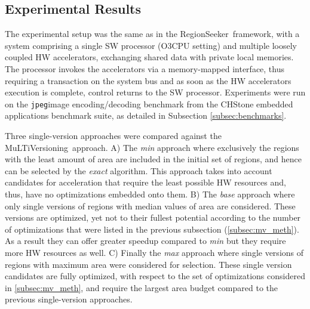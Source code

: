 \documentclass[]{usiinfthesis}
\newcommand{\rseeker}{{RegionSeeker}}
\newcommand{\multi}{MuLTiVersioning}
\newcommand{\plms}{{private local memories}}
\newcommand{\jpeg}{\texttt{jpeg}}
\begin{document}

\subsection{Experimental Results}
\label{subsec:mv_res}

The experimental setup was the same as in the \rseeker\ framework, with a system comprising a single 
SW processor (O3CPU setting) 
and multiple loosely coupled HW accelerators, exchanging shared data with \plms.
The processor invokes the accelerators via a memory-mapped
interface, thus requiring a transaction on the system bus and as soon as the HW accelerators execution is complete, control returns to the SW processor.
Experiments were run on the \jpeg image encoding/decoding benchmark from the CHStone embedded applications benchmark suite, as detailed in Subsection \ref{subsec:benchmarks}.\par

Three single-version approaches were compared against the \multi\ approach.
A) The \emph{min} approach where exclusively the regions with the least amount of area are included in the initial set of regions, and hence can be selected by the \emph{exact} algorithm. This approach 
takes into account candidates for acceleration that require the least possible HW resources and, thus, 
have no optimizations embedded onto them.
B) The \emph{base} approach
where only single versions of regions with median values of area are considered. These versions are
optimized, yet not to their fullest potential according to the number of optimizations that were
listed in the previous subsection (\ref{subsec:mv_meth}). As a result they can offer greater speedup compared to \emph{min}
but they require more HW resources as well.
C) Finally the \emph{max} approach where single versions of regions with maximum 
area were considered for selection. These single version candidates are fully optimized, with respect
to the set of optimizations considered in \ref{subsec:mv_meth}, and require the largest area budget 
compared to the previous single-version approaches.\par
\end{document}
